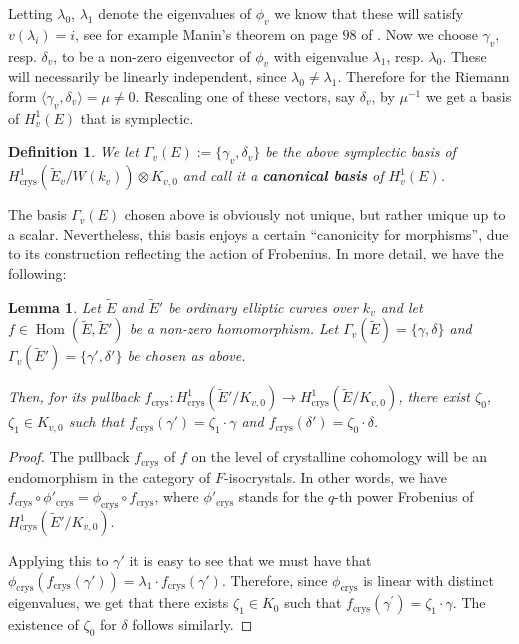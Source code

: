 \documentclass[12pt,twoside,a4paper]{article}
\theoremstyle{plain}%
\newtheorem{definition}[theorem]{Definition} %
\newtheorem{lemma}[theorem]{Lemma}
\DeclareMathOperator{\homm}{Hom}
\DeclareMathOperator{\crys}{crys}
\begin{document}
	Letting $\lambda_0$, $\lambda_1$ denote the eigenvalues of $\phi_{v}$ we know that these will satisfy $v(\lambda_i)=i$, see for example Manin's theorem on page $98$ of \cite{demazure}. Now we choose $\gamma_v$, resp. $\delta_v$, to be a non-zero eigenvector of $\phi_v$ with eigenvalue $\lambda_1$, resp. $\lambda_0$. These will necessarily be linearly independent, since $\lambda_0\neq  \lambda_1$. Therefore for the Riemann form $\langle\gamma_v,\delta_v\rangle=\mu\neq 0$. Rescaling one of these vectors, say $\delta_v$, by $\mu^{-1}$ we get a basis of $H^1_{v}(E)$ that is symplectic. 
	
	\begin{definition}\label{defcanord}
		We let $\Gamma_v(E):=\{\gamma_v,\delta_v\}$ be the above symplectic basis of $H^1_{\crys}(\tilde{E}_{v}/W(k_v))\otimes K_{v,0}$ and call it a \textbf{canonical basis }of $H^1_v(E)$.
	\end{definition}
	
	The basis $\Gamma_v(E)$ chosen above is obviously not unique, but rather unique up to a scalar. 
Nevertheless, this basis enjoys a certain ``canonicity for morphisms'', due to its construction reflecting the action of Frobenius. In more detail, we have the following:
\begin{lemma}\label{lemmacrysordbasis}Let $\tilde{E}$ and $\tilde{E}'$ be ordinary elliptic curves over $k_v$ and let $f\in \homm(\tilde{E},\tilde{E}')$ be a non-zero homomorphism. Let $\Gamma_v(\tilde{E})=\{\gamma,\delta\}$ and $\Gamma_v(\tilde{E}')=\{\gamma',\delta'\}$ be chosen as above. 
	
	Then, for its pullback $f_{\crys}:H^1_{\crys}(\tilde{E}'/K_{v,0})\rightarrow H^1_{\crys}(\tilde{E}/K_{v,0})$, there exist $\zeta_0$, $\zeta_1\in K_{v,0}$ such that $f_{\crys}(\gamma')=\zeta_1\cdot \gamma$ and $f_{\crys}(\delta')=\zeta_0\cdot \delta$.
\end{lemma}
\begin{proof} The pullback $f_{\crys}$ of $f$ on the level of crystalline cohomology will be an endomorphism in the category of $F$-isocrystals. In other words, we have $f_{\crys}\circ\phi'_{\crys} =\phi_{\crys}\circ f_{\crys}$, where $\phi'_{\crys}$ stands for the $q$-th power Frobenius of $H^1_{\crys}(\tilde{E}'/K_{v,0})$.
	
	 Applying this to $\gamma'$ it is easy to see that we must have that $\phi_{\crys}( f_{\crys}(\gamma'))= \lambda_1\cdot f_{\crys}(\gamma')$. Therefore, since $\phi_{\crys}$ is linear with distinct eigenvalues, we get that there exists $\zeta_1\in K_0$ such that $f_{\crys}(\gamma^{\prime})=\zeta_1\cdot \gamma$. The existence of $\zeta_0$ for $\delta$ follows similarly.
\end{proof}
\end{document}
